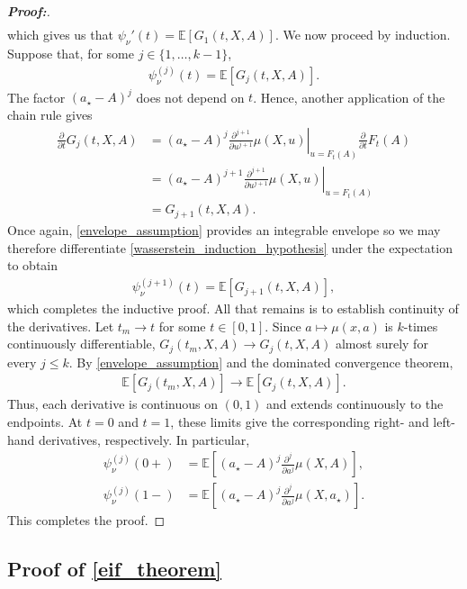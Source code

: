 \documentclass[11pt,twoside]{article}
\theoremstyle{definition}
\theoremstyle{remark}
\begin{document}
\begin{proof}[\textbf{Proof:}]
\begin{align*}
\end{align*}
which gives us that $ \psi_\nu'(t) = \mathbb{E}[G_1(t,X,A)]$. We now proceed by induction. Suppose that, for some $j\in\{1,\ldots,k-1\}$,
\begin{align} \label{wasserstein_induction_hypothesis}
    \psi_\nu^{(j)}(t) = \mathbb{E}[G_j(t,X,A)].
\end{align}
The factor $(a_\star-A)^j$ does not depend on $t$. Hence, another application of the chain rule gives
\begin{align*}
    \frac{\partial}{\partial t} G_j(t,X,A) &= (a_\star-A)^j \left. \frac{\partial^{j+1}}{\partial u^{j+1}} \mu(X,u) \right|_{u=F_t(A)} \frac{\partial}{\partial t}F_t(A)\\
    &= (a_\star-A)^{j+1} \left. \frac{\partial^{j+1}}{\partial u^{j+1}} \mu(X,u) \right|_{u=F_t(A)}\\
    &= G_{j+1}(t,X,A).
\end{align*}
Once again, \cref{envelope_assumption} provides an integrable envelope so we may therefore differentiate
\cref{wasserstein_induction_hypothesis} under the expectation to obtain
\begin{align*}
    \psi_\nu^{(j+1)}(t) = \mathbb{E}[G_{j+1}(t,X,A)],
\end{align*}
which completes the inductive proof. All that remains is to establish continuity of the derivatives. Let $t_m\to t$ for some $t\in[0,1]$. Since $a\mapsto\mu(x,a)$ is $k$-times continuously differentiable, $G_j(t_m,X,A) \longrightarrow G_j(t,X,A)$ almost surely for every $j\leq k$. By \cref{envelope_assumption} and the dominated convergence
theorem,
\begin{align*}
    \mathbb{E}[G_j(t_m,X,A)] \longrightarrow \mathbb{E}[G_j(t,X,A)].
\end{align*}
Thus, each derivative is continuous on $(0,1)$ and extends continuously to the endpoints. At $t=0$ and $t=1$, these limits give the corresponding right- and left-hand derivatives, respectively. In particular,
\begin{align*}
    \psi_\nu^{(j)}(0+) &= \mathbb{E}\left[ (a_\star-A)^j \frac{\partial^j}{\partial a^j} \mu(X,A) \right], \\
    \psi_\nu^{(j)}(1-) &= \mathbb{E}\left[ (a_\star-A)^j \frac{\partial^j}{\partial a^j} \mu(X,a_\star) \right].
\end{align*}
This completes the proof.

\end{proof}

\subsection{Proof of \cref{eif_theorem}} \label{eif_theorem_proof}
\end{document}
